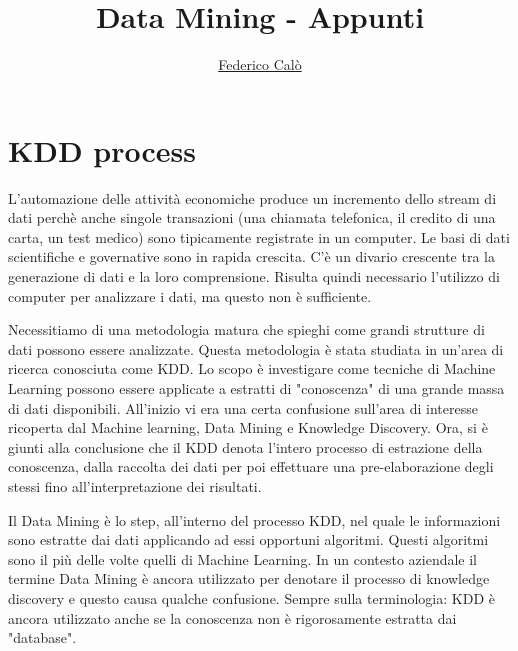 \documentclass[a4paper]{extarticle}
\title{Data Mining - Appunti}
\author{\href{http://www.federicocalo.it}{Federico Calò} }
\date{}
\begin{document}
\maketitle
\newpage
\tableofcontents
\voffset -30pt

\newpage

\section{KDD process}

L'automazione delle attività economiche produce un incremento dello stream di dati perchè anche singole transazioni (una chiamata telefonica, il credito di una carta, un test medico) sono tipicamente registrate in un computer.
Le basi di dati scientifiche e governative sono in rapida crescita. C'è un divario crescente tra la generazione di dati e la loro comprensione. Risulta quindi necessario l'utilizzo di computer per analizzare i dati, ma questo non è sufficiente.

Necessitiamo di una metodologia matura che spieghi come grandi strutture di dati possono essere analizzate. Questa metodologia è stata studiata in un'area di ricerca conosciuta come KDD. Lo scopo è investigare come tecniche di Machine Learning possono essere applicate a estratti di "conoscenza" di una grande massa di dati disponibili. All'inizio vi era una certa confusione sull'area di interesse ricoperta dal Machine learning, Data Mining e Knowledge Discovery. Ora, si è giunti alla conclusione che il KDD denota l'intero processo di estrazione della conoscenza, dalla raccolta dei dati per poi effettuare una pre-elaborazione degli stessi fino  all'interpretazione dei risultati.

Il Data Mining è lo step, all'interno del processo KDD, nel quale le informazioni sono estratte dai dati applicando ad essi opportuni algoritmi. Questi algoritmi sono il più delle volte quelli di Machine Learning. 
In un contesto aziendale il termine Data Mining è ancora utilizzato per denotare il processo di knowledge discovery e questo causa qualche confusione. Sempre sulla terminologia: KDD è ancora utilizzato anche se la conoscenza non è rigorosamente estratta dai "database". 
\end{document}
